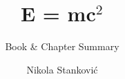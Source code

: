 \documentclass[a4paper,12pt]{scrreprt}
\newcommand{\autoren}{Nikola Stanković}
\newcommand{\dokumenttitel}{E = mc$^2$}
\newcommand{\dokumentuntertitel}{Book \& Chapter Summary}
\begin{document}
\author{\autoren}

\title{\dokumenttitel}
\subtitle{\dokumentuntertitel}
\maketitle
\tableofcontents








\end{document}

